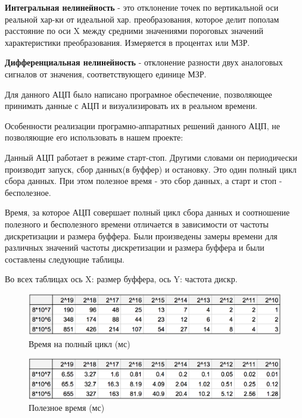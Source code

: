 \documentclass[../paper.tex]{subfiles}
\begin{document}
\textbf{Интегральная нелинейность} - это отклонение точек по вертикальной оси реальной хар-ки от идеальной хар. преобразования, которое делит пополам расстояние по оси X между средними значениями пороговых значений характеристики преобразования. Измеряется в процентах или  МЗР.

\textbf{Дифференциальная нелинейность} - отклонение разности двух аналоговых сигналов от значения, соответствующего единице МЗР.

Для данного АЦП было написано програмное обеспечение, позволяющее принимать данные с АЦП и визуализировать их в реальном времени.

Особенности реализации програмно-аппаратных решений данного АЦП, не позволяющие его использовать в нашем проекте:

Данный АЦП работает в режиме старт-стоп. Другими словами он периодически производит запуск, сбор данных(в буффер) и остановку. Это один полный цикл сбора данных. При этом полезное время - это сбор данных, а старт и стоп - бесполезное.

Время, за которое АЦП совершает полный цикл сбора данных и соотношение полезного и бесполезного времени отличается в зависимости от частоты дискретизации и размера буффера. Были произведены замеры времени для различных значений частоты дискретизации и размера буффера и были составлены следующие таблицы.

Во всех таблицах ось X: размер буффера, ось Y: частота дискр.

\begin{figure}[H]
\centering
\includegraphics[width=\textwidth]{images/cycle-time.png}
\caption{Время на полный цикл (мс)}
\end{figure}

\begin{figure}[H]
\centering
\includegraphics[width=\textwidth]{images/good-time.png}
\caption{Полезное время (мс)}
\end{figure}
\end{document}
